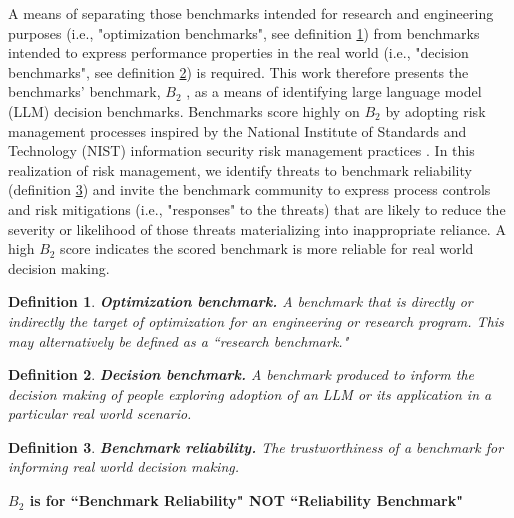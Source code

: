 \documentclass{article}
\newtheorem{dfn}{Definition}[section]
\newcommand\bb{$B_2$ }
\begin{document}
A means of separating those benchmarks intended for research and engineering purposes (i.e., "optimization benchmarks", see definition \ref{dfn:optimization_benchmark}) from benchmarks intended to express performance properties in the real world (i.e., "decision benchmarks", see definition \ref{dfn:decision_benchmark}) is required. This work therefore presents the benchmarks' benchmark, \bb, as a means of identifying large language model (LLM) decision benchmarks. Benchmarks score highly on \bb by adopting risk management processes inspired by the National Institute of Standards and Technology (NIST) information security risk management practices \cite{nist80030r1}. In this realization of risk management, we identify threats to benchmark reliability (definition \ref{dfn:benchmark_reliability}) and invite the benchmark community to express process controls and risk mitigations (i.e., "responses" to the threats) that are likely to reduce the severity or likelihood of those threats materializing into inappropriate reliance. A high \bb score indicates the scored benchmark is more reliable for real world decision making.

\begin{dfn}
\label{dfn:optimization_benchmark}
{\bf Optimization benchmark.} A benchmark that is directly or indirectly the target of optimization for an engineering or research program. This may alternatively be defined as a ``research benchmark."
\end{dfn}

\begin{dfn}
\label{dfn:decision_benchmark}
{\bf Decision benchmark.} A benchmark produced to inform the decision making of people exploring adoption of an LLM or its application in a particular real world scenario.
\end{dfn}

\begin{dfn}
\label{dfn:benchmark_reliability}
{\bf Benchmark reliability.} The trustworthiness of a benchmark for informing real world decision making.
\end{dfn}

\begin{center}
    \begin{tcolorbox}[colback=blue!10, colframe=blue!50, width=\textwidth, boxrule=0.5mm, sharp corners, coltext=black, halign=center]
        \bf \bb is for ``Benchmark Reliability" NOT ``Reliability Benchmark"
    \end{tcolorbox}
\end{center}
\end{document}
